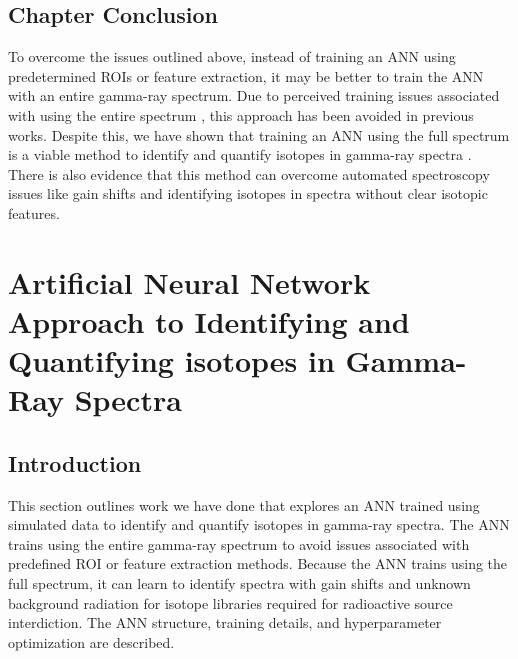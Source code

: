 \documentclass[tocnosub,noragright,centerchapter,12pt,fullpage]{uiucecethesis09}
\begin{document}
\section{Chapter Conclusion}

To overcome the issues outlined above, instead of training an ANN using predetermined ROIs or feature extraction, it may be better to train the ANN with an entire gamma-ray spectrum. Due to perceived training issues associated with using the entire spectrum \cite{Pilato1999,Yoshida2002}, this approach has been avoided in previous works. Despite this, we have shown that training an ANN using the full spectrum is a viable method to identify and quantify isotopes in gamma-ray spectra \cite{kamuda2017,kamudaThesis2017}. There is also evidence that this method can overcome automated spectroscopy issues like gain shifts and identifying isotopes in spectra without clear isotopic features.





\chapter{Artificial Neural Network Approach to Identifying and Quantifying isotopes in Gamma-Ray Spectra} \label{ANNIQ}

\section{Introduction}

This section outlines work we have done that explores an ANN trained using simulated data to identify and quantify isotopes in gamma-ray spectra. The ANN trains using the entire gamma-ray spectrum to avoid issues associated with predefined ROI or feature extraction methods. Because the ANN trains using the full spectrum, it can learn to identify spectra with gain shifts and unknown background radiation for isotope libraries required for radioactive source interdiction. The ANN structure, training details, and hyperparameter optimization are described. 
\end{document}
